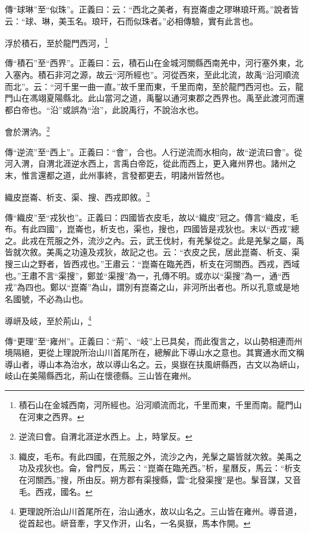 {\noindent\zhuan{}\fzbyks 傳“球琳”至“似珠”。正義曰：云：“西北之美者，有崑崙虛之璆琳琅玕焉。”說者皆云：“球、琳，美玉名。琅玕，石而似珠者。”必相傳驗，實有此言也。 \par}

浮於積石，至於龍門西河，\footnote{積石山在金城西南，河所經也。沿河順流而北，千里而東，千里而南。龍門山在河東之西界。}

{\noindent\zhuan{}\fzbyks 傳“積石”至“西界”。正義曰：云，積石山在金城河關縣西南羌中，河行塞外東，北入塞內。積石非河之源，故云“河所經也”。河從西來，至此北流，故禹“沿河順流而北”。云：“河千里一曲一直。”故千里而東，千里而南，至於龍門西河也。云，龍門山在馮翊夏陽縣北。此山當河之道，禹鑿以通河東郡之西界也。禹至此渡河而還都白帝也。“沿”或誤為“治”，此說禹行，不說治水也。 \par}

會於渭汭。\footnote{逆流曰會。自渭北涯逆水西上。上，時掌反。}

{\noindent\zhuan{}\fzbyks 傳“逆流”至“西上”。正義曰：“會”，合也。人行逆流而水相向，故“逆流曰會”。從河入渭，自渭北涯逆水西上，言禹白帝訖，從此而西上，更入雍州界也。諸州之末，惟言還都之道，此州事終，言發都更去，明諸州皆然也。 \par}

織皮崑崙、析支、渠、搜、西戎即敘。\footnote{織皮，毛布。有此四國，在荒服之外，流沙之內，羌髳之屬皆就次敘。美禹之功及戎狄也。侖，曾門反，馬云：“崑崙在臨羌西。”析，星曆反，馬云：“析支在河關西。”搜，所由反。朔方郡有渠搜縣，雲“北發渠搜”是也。髳音謀，又音毛。西戎，國名。}

{\noindent\zhuan{}\fzbyks 傳“織皮”至“戎狄也”。正義曰：四國皆衣皮毛，故以“織皮”冠之。傳言“織皮，毛布。有此四國”，崑崙也，析支也，渠也，搜也，四國皆是戎狄也。末以“西戎”總之。此戎在荒服之外，流沙之內。云，武王伐紂，有羌髳從之。此是羌髳之屬，禹皆就次敘。美禹之功遠及戎狄，故記之也。云：“衣皮之民，居此崑崙、析支、渠搜三山之野者，皆西戎也。”王肅云：“崑崙在臨羌西，析支在河關西。西戎，西域也。”王肅不言“渠搜”，鄭並“渠搜”為一，孔傳不明。或亦以“渠搜”為一，通“西戎”為四也。鄭以“崑崙”為山，謂別有崑崙之山，非河所出者也。所以孔意或是地名國號，不必為山也。 \par}

導岍及岐，至於荊山，\footnote{更理說所治山川首尾所在，治山通水，故以山名之。三山皆在雍州。導音道，從首起也。岍音牽，字又作汧，山名，一名吳嶽，馬本作開。}

{\noindent\zhuan{}\fzbyks 傳“更理”至“雍州”。正義曰：“荊”、“岐”上已具矣，而此復言之，以山勢相連而州境隔絕，更從上理說所治山川首尾所在，總解此下導山水之意也。其實通水而文稱導山者，導山本為治水，故以導山名之。云，吳嶽在扶風岍縣西，古文以為岍山，岐山在美陽縣西北，荊山在懷德縣。三山皆在雍州。 \par}

